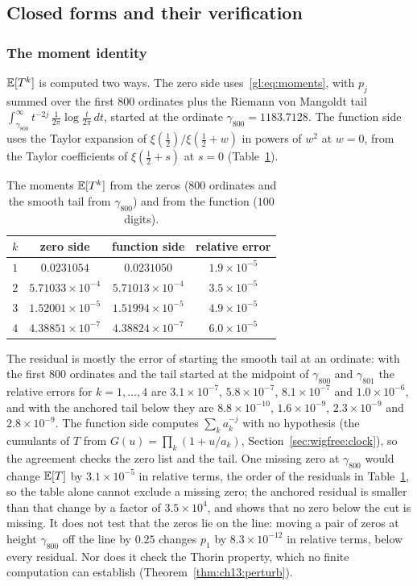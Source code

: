\subsection{Closed forms and their verification}\label{gl:sec:numerics}

\subsubsection{The moment identity}

$\mathbb{E}[T^k]$ is computed two ways. The zero side uses~\eqref{gl:eq:moments}, with $p_j$ summed over the first $800$ ordinates plus the Riemann von Mangoldt tail $\int_{\gamma_{800}}^\infty t^{-2j}\,\tfrac{1}{2\pi}\log\tfrac{t}{2\pi}\,dt$, started at the ordinate $\gamma_{800}=1183.7128$. The function side uses the Taylor expansion of $\xi(\tfrac12)/\xi(\tfrac12+w)$ in powers of $w^2$ at $w=0$, from the Taylor coefficients of $\xi(\tfrac12+s)$ at $s=0$ (Table~\ref{gl:tab:moments}).
\begin{table}[htbp]
\caption{The moments $\mathbb{E}[T^k]$ from the zeros ($800$ ordinates and the smooth tail from $\gamma_{800}$) and from the function ($100$ digits).}
\label{gl:tab:moments}
\centering
\begin{tabular}{cccc}
\toprule
$k$ & zero side & function side & relative error\\
\midrule
$1$ & $0.0231054$ & $0.0231050$ & $1.9\times10^{-5}$\\
$2$ & $5.71033\times10^{-4}$ & $5.71013\times10^{-4}$ & $3.5\times10^{-5}$\\
$3$ & $1.52001\times10^{-5}$ & $1.51994\times10^{-5}$ & $4.9\times10^{-5}$\\
$4$ & $4.38851\times10^{-7}$ & $4.38824\times10^{-7}$ & $6.0\times10^{-5}$\\
\bottomrule
\end{tabular}
\end{table}
The residual is mostly the error of starting the smooth tail at an ordinate: with the first $800$ ordinates and the tail started at the midpoint of $\gamma_{800}$ and $\gamma_{801}$ the relative errors for $k=1,\dots,4$ are $3.1\times10^{-7}$, $5.8\times10^{-7}$, $8.1\times10^{-7}$ and $1.0\times10^{-6}$, and with the anchored tail below they are $8.8\times10^{-10}$, $1.6\times10^{-9}$, $2.3\times10^{-9}$ and $2.8\times10^{-9}$. The function side computes $\sum_ka_k^{-j}$ with no hypothesis (the cumulants of $T$ from $G(u)=\prod_k(1+u/a_k)$, Section~\ref{sec:wigfree:clock}), so the agreement checks the zero list and the tail. One missing zero at $\gamma_{800}$ would change $\mathbb{E}[T]$ by $3.1\times10^{-5}$ in relative terms, the order of the residuals in Table~\ref{gl:tab:moments}, so the table alone cannot exclude a missing zero; the anchored residual is smaller than that change by a factor of $3.5\times10^{4}$, and shows that no zero below the cut is missing. It does not test that the zeros lie on the line: moving a pair of zeros at height $\gamma_{800}$ off the line by $0.25$ changes $p_1$ by $8.3\times10^{-12}$ in relative terms, below every residual. Nor does it check the Thorin property, which no finite computation can establish (Theorem~\ref{thm:ch13:perturb}).

